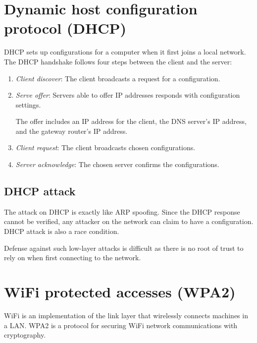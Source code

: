 \section{Dynamic host configuration protocol (DHCP)}
DHCP sets up configurations for a computer when it first joins a local network. The DHCP handshake follows four steps between the client and the server:
\begin{enumerate}
    \item \emph{Client discover}: The client broadcasts a request for a configuration.
    \item \emph{Serve offer}: Servers able to offer IP addresses responds with configuration settings.
    
    The offer includes an IP address for the client, the DNS server's IP address, and the gateway router's IP address.
    
    \item \emph{Client request}: The client broadcasts chosen configurations.
    \item \emph{Server acknowledge}: The chosen server confirms the configurations.
\end{enumerate}

\subsection{DHCP attack}
The attack on DHCP is exactly like ARP spoofing. Since the DHCP response cannot be verified, any attacker on the network can claim to have a configuration. DHCP attack is also a race condition.

\medskip
Defense against such low-layer attacks is difficult as there is no root of trust to rely on when first connecting to the network.

\section{WiFi protected accesses (WPA2)}
WiFi is an implementation of the link layer that wirelessly connects machines in a LAN. WPA2 is a protocol for securing WiFi network communications with cryptography.

